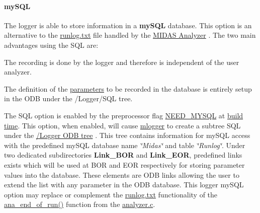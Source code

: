 \par
 \label{F_mySQL_idx_mySQL_database}
\hypertarget{F_mySQL_idx_mySQL_database}{}
 \hypertarget{F_mySQL_F_Logger_mySQL}{}\paragraph{mySQL}\label{F_mySQL_F_Logger_mySQL}
The logger is able to store information in a {\bfseries mySQL} database. This option is an alternative to the \hyperlink{DataAnalysis_DA_run_log_file}{runlog.txt} file handled by the \hyperlink{DataAnalysis_DA_Midas_Analyzer}{MIDAS Analyzer} . The two main advantages using the SQL are:
\begin{DoxyItemize}
\item The recording is done by the logger and therefore is independent of the user analyzer.
\item The definition of the \hyperlink{structparameters}{parameters} to be recorded in the database is entirely setup in the ODB under the /Logger/SQL tree.
\end{DoxyItemize}

The SQL option is enabled by the preprocessor flag \hyperlink{BuildingOptions_BO_NEED_MYSQL}{NEED\_\-MYSQL} at \hyperlink{BuildingOptions_BO_building_option}{build time}. This option, when enabled, will cause \hyperlink{F_Logging_F_mlogger_utility}{mlogger} to create a subtree SQL under the \hyperlink{F_Logging_Data_F_Logger_tree}{/Logger ODB tree} . This tree contains information for mySQL access with the predefined mySQL database name {\itshape \char`\"{}Midas\char`\"{}\/} and table {\itshape \char`\"{}Runlog\char`\"{}\/}. Under two dedicated subdirectories {\bfseries Link\_\-BOR} and {\bfseries Link\_\-EOR}, predefined links exists which will be used at BOR and EOR respectively for storing parameter values into the database. These elements are ODB links allowing the user to extend the list with any parameter in the ODB database. This logger mySQL option may replace or complement the \hyperlink{DataAnalysis_DA_run_log_file}{runlog.txt} functionality of the \hyperlink{analyzer_8c_a8e03cbe2637bd6f4488a659c9f23d29e}{ana\_\-end\_\-of\_\-run()} function from the \hyperlink{analyzer_8c}{analyzer.c}.

